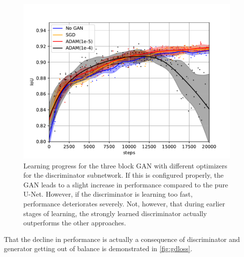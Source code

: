 \documentclass[aps,prl,twocolumn,groupedaddress,amsmath,amssymb]{revtex4-1}
\begin{document}
    \begin{figure}[tbp]
        \begin{center}
        \includegraphics[width=\linewidth]{figures/gan_3_opt.pdf}
        \end{center}
        \caption{Learning progress for the three block GAN with different optimizers for the
        discriminator subnetwork. If this is configured properly, the GAN leads to a slight increase
        in performance compared to the pure U-Net. However, if the discriminator is learning too 
        fast, performance deteriorates severely. Not, however, that during earlier stages of learning,
        the strongly learned discriminator actually outperforms the other approaches.}
        \label{fig:gan_3_opt}
    \end{figure}

    That the decline in performance is actually a consequence of discriminator and generator getting
    out of balance is demonstrated in \autoref{fig:gdloss}. 
\end{document}

